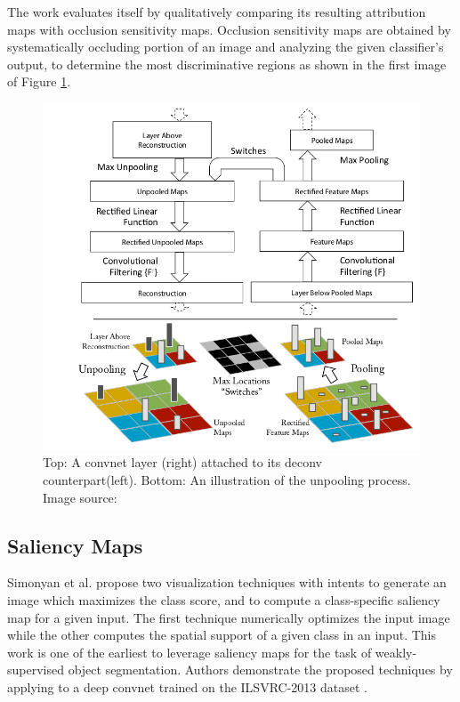 \documentclass[../report.tex]{subfiles}
\begin{document}
    The work evaluates itself by qualitatively comparing its resulting attribution maps with occlusion sensitivity maps. Occlusion sensitivity maps are obtained by systematically occluding portion of an image and analyzing the given classifier’s output, to determine the most discriminative regions as shown in the first image of Figure \ref{osm}.

    \begin{figure}[H]
    	\includegraphics[width=\textwidth]{images/chapter3/deconv_crop.png}
    	\caption{Top: A convnet layer (right) attached to its deconv counterpart(left). Bottom: An illustration of the unpooling process. Image source: \cite{matthew2014visualizing}}
    	\label{osm}
    \end{figure}
    
    
 \subsection{Saliency Maps}
 Simonyan et al. \cite{simonyan2013deep} propose two visualization techniques with intents to generate an image which maximizes the class score, and to compute a class-specific saliency map for a given input. The first technique numerically optimizes the input image while the other computes the spatial support of a given class in an input. This work is one of the earliest to leverage saliency maps for the task of weakly-supervised object segmentation. Authors demonstrate the proposed techniques by applying to a deep convnet trained on the ILSVRC-2013 dataset \cite{ILSVRC15}.
 
\end{document}
